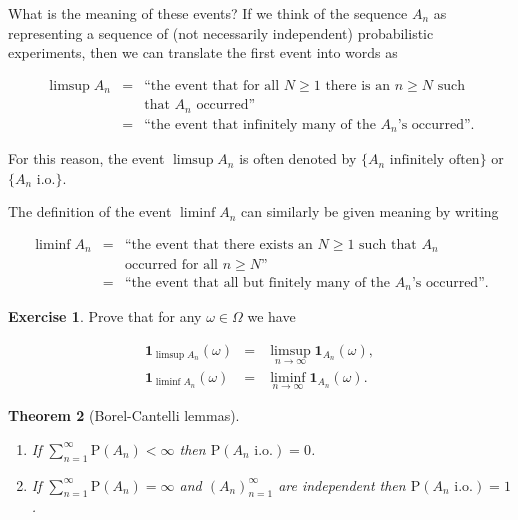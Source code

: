 \documentclass[11pt]{report}
\theoremstyle{plain}
\newtheorem{thm}{Theorem}[chapter]
\theoremstyle{definition}
\newtheorem{xexercise}[thm]{Exercise}
\begin{document}
What is the meaning of these events? If we think of
the sequence $A_n$ as representing a sequence of (not
necessarily independent) probabilistic experiments,
then we can translate the first event into words as

\begin{eqnarray*}
\limsup A_n &=& \textrm{``the event that for all $N\ge 1$ there is an $n\ge N$ such} \\
&  & \textrm{that $A_n$ occurred''} \\ &=& \textrm{``the event that infinitely many of the $A_n$'s occurred''.}
\end{eqnarray*}

For this reason, the event $\limsup A_n$ is often
denoted by $\{ A_n\textrm{ infinitely often}\}$ or
$\{A_n \textrm{ i.o.}\}$.

The definition of the event $\liminf A_n$ can
similarly be given meaning by writing

\begin{eqnarray*}
\liminf A_n &=& \textrm{``the event that there exists an $N\ge 1$ such that $A_n$ } \\
&  & \textrm{occurred for all $n\ge N$''} \\ &=& \textrm{``the event that all but finitely many of the $A_n$'s occurred''.}
\end{eqnarray*}

\begin{xexercise}
Prove that for any $\omega \in \Omega$ we have

\begin{eqnarray*}
\mathbf{1}_{\limsup A_n}(\omega) &=& \limsup_{n\to\infty} \mathbf{1}_{A_n}(\omega), \\
\mathbf{1}_{\liminf A_n}(\omega) &=& \liminf_{n\to\infty} \mathbf{1}_{A_n}(\omega).
\end{eqnarray*}

\end{xexercise}

\begin{thm}[Borel-Cantelli lemmas]

\begin{enumerate}[label=(\roman*)]
\item If $\sum_{n=1}^\infty \mathrm{P}(A_n) < \infty$ then
$\mathrm{P}(A_n\textrm{ i.o.}) = 0$.

\item If $\sum_{n=1}^\infty \mathrm{P}(A_n) = \infty$ and
$(A_n)_{n=1}^\infty$ are independent then
$\mathrm{P}(A_n\textrm{ i.o.}) = 1$.
\end{enumerate}

\end{thm}
\end{document}
